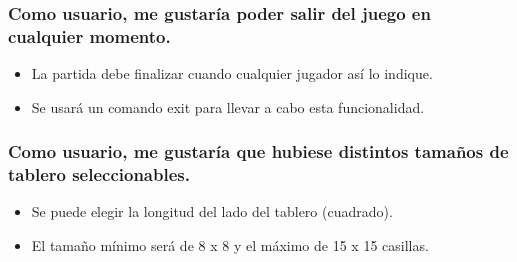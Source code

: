 \documentclass{article}
\begin{document}
\subsubsection*{Como usuario, me gustaría poder salir del juego en cualquier momento.}

\begin{itemize}

\item La partida debe finalizar cuando cualquier jugador así lo indique.

\item Se usará un comando exit para llevar a cabo esta funcionalidad.

\end{itemize}

\subsubsection*{Como usuario, me gustaría que hubiese distintos tamaños de tablero seleccionables.}

\begin{itemize}

\item Se puede elegir la longitud del lado del tablero (cuadrado).

\item El tamaño mínimo será de 8 x 8 y el máximo de 15 x 15 casillas.

\end{itemize}
\end{document}
